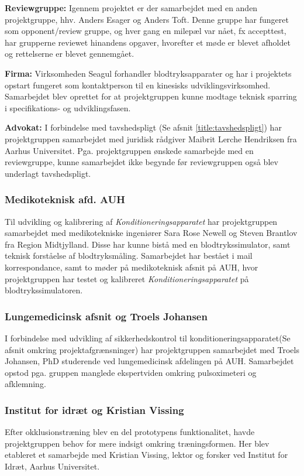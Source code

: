 \textbf{Reviewgruppe:} Igennem projektet er der samarbejdet med en anden projektgruppe, hhv. Anders Esager og Anders Toft. Denne gruppe har fungeret som opponent/review gruppe, og hver gang en milepæl var nået, fx accepttest, har grupperne reviewet hinandens opgaver, hvorefter et møde er blevet afholdet og rettelserne er blevet gennemgået.  

\textbf{Firma:} Virksomheden Seagul forhandler blodtryksapparater og har i projektets opstart fungeret som kontaktperson til en kinesisks udviklingsvirksomhed. Samarbejdet blev oprettet for at projektgruppen kunne modtage teknisk sparring i specifikations- og udviklingsfasen. 

\textbf{Advokat:} I forbindelse med tavshedspligt (Se afsnit \ref{title:tavshedspligt}) har projektgruppen samarbejdet med juridisk rådgiver Maibrit Lerche Hendriksen fra Aarhus Universitet. Pga. projektgruppen ønskede samarbejde med en reviewgruppe, kunne samarbejdet ikke begynde før reviewgruppen også blev underlagt tavshedspligt.

\subsubsection{Medikoteknisk afd. AUH}
Til udvikling og kalibrering af \textit{Konditioneringsapparatet} har projektgruppen samarbejdet med medikotekniske ingeniører  Sara Rose Newell og Steven Brantlov fra Region Midtjylland. Disse har kunne bistå med en blodtrykssimulator, samt teknisk forståelse af blodtryksmåling. Samarbejdet har bestået i mail korrespondance, samt to møder på medikoteknisk afsnit på AUH, hvor projektgruppen har testet og kalibreret \textit{Konditioneringsapparatet} på blodtrykssimulatoren. 

\subsubsection{Lungemedicinsk afsnit og Troels Johansen}
I forbindelse med udvikling af sikkerhedskontrol til konditioneringsapparatet(Se afsnit  omkring projektafgrænsninger) har projektgruppen samarbejdet med Troels Johansen, PhD studerende ved lungemedicinsk afdelingen på AUH. Samarbejdet opstod pga. gruppen manglede ekspertviden omkring pulsoximeteri og afklemning.

\subsubsection{Institut for idræt og Kristian Vissing} 
Efter okklusionstræning blev en del prototypens funktionalitet, havde projektgruppen behov for mere indsigt omkring træningsformen. Her blev etableret et samarbejde med Kristian Vissing, lektor og forsker ved Institut for Idræt, Aarhus Universitet.  

